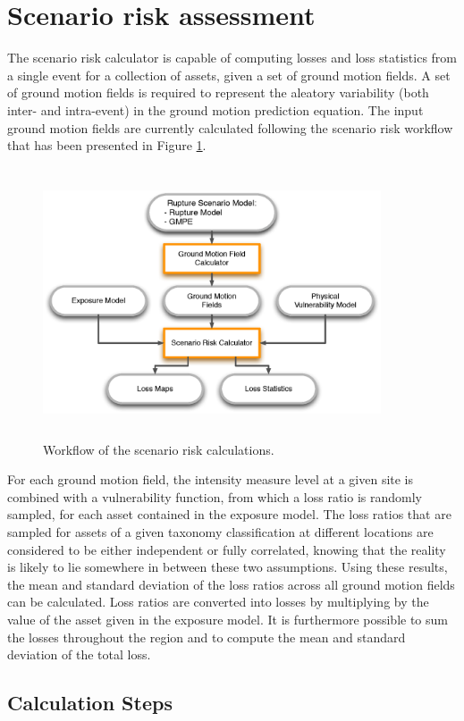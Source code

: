\section{Scenario risk assessment}
The scenario risk calculator is capable of computing losses and loss 
statistics from a single event for a collection of assets, given a set 
of ground motion fields. A set of ground motion fields is required to 
represent the aleatory variability (both inter- and intra-event) in 
the ground motion prediction equation. The input ground motion fields
are currently calculated following the scenario risk workflow that has 
been presented in Figure \ref{fig:Scheme_scenrisk_calc}.
%
\begin{figure}[ht]
\centering
\includegraphics[width=10cm,height=8cm]{./figures/Scheme_Scenario_calc.eps}
\caption{Workflow of the scenario risk calculations.}
\label{fig:Scheme_scenrisk_calc}
\end{figure}
%
For each ground motion field, the intensity measure level at a given 
site is combined with a vulnerability function, from which a loss ratio is randomly sampled, for each asset contained in the exposure model. The loss ratios that are sampled for assets of a given taxonomy classification at different locations are considered to be either independent or fully correlated, knowing that the reality is likely to lie somewhere in between these two assumptions. Using these results, the mean and standard deviation of the loss ratios across all ground motion fields can be calculated. Loss ratios are converted into losses by multiplying by the value of the asset given in the exposure model. It is furthermore possible to sum the losses throughout the region and to compute the mean and standard deviation of the total loss. 

\subsection{Calculation Steps}

